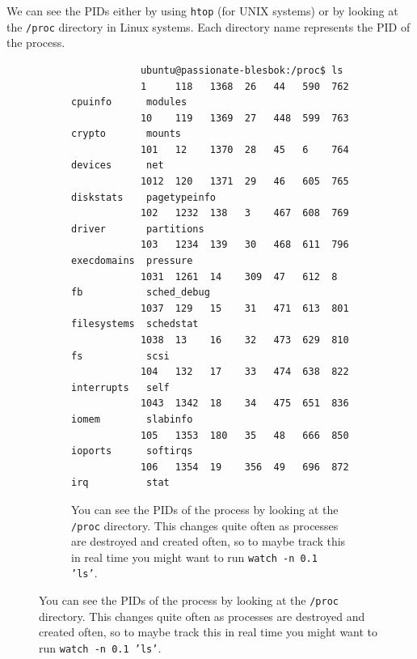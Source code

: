 \documentclass{article}
\begin{document}
    \begin{example}
      We can see the PIDs either by using \texttt{htop} (for UNIX systems) or by looking at the \texttt{/proc} directory in Linux systems. Each directory name represents the PID of the process. 
      \begin{figure}[H]
        \centering
        \begin{subfigure}[b]{0.95\textwidth}
        \centering
          \begin{lstlisting}
            ubuntu@passionate-blesbok:/proc$ ls
            1     118   1368  26   44   590  762        cpuinfo      modules
            10    119   1369  27   448  599  763        crypto       mounts
            101   12    1370  28   45   6    764        devices      net
            1012  120   1371  29   46   605  765        diskstats    pagetypeinfo
            102   1232  138   3    467  608  769        driver       partitions
            103   1234  139   30   468  611  796        execdomains  pressure
            1031  1261  14    309  47   612  8          fb           sched_debug
            1037  129   15    31   471  613  801        filesystems  schedstat
            1038  13    16    32   473  629  810        fs           scsi
            104   132   17    33   474  638  822        interrupts   self
            1043  1342  18    34   475  651  836        iomem        slabinfo
            105   1353  180   35   48   666  850        ioports      softirqs
            106   1354  19    356  49   696  872        irq          stat
          \end{lstlisting}
          \caption{You can see the PIDs of the process by looking at the \texttt{/proc} directory. This changes quite often as processes are destroyed and created often, so to maybe track this in real time you might want to run \texttt{watch -n 0.1 'ls'}. }
          \label{fig:proc}
        \end{subfigure}


\end{figure}
\end{example}
\end{document}
